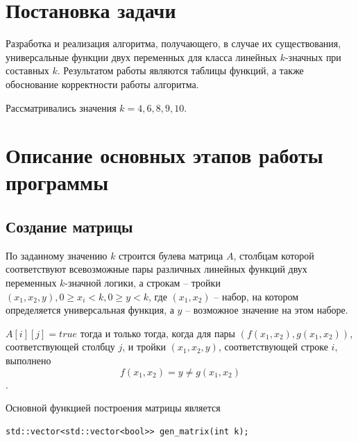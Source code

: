 \documentclass[oneside,final,14pt]{extreport}
\begin{document}



  \chapter*{Постановка задачи}
  
Разработка и реализация алгоритма, получающего, в случае их существования, универсальные функции 
двух переменных для класса линейных \(k\)-значных при составных \(k\). Результатом работы являются таблицы 
функций, а также обоснование корректности работы алгоритма.
  
Рассматривались значения \(k = 4, 6, 8, 9, 10\).

\chapter*{Описание основных этапов работы программы}

\section*{Создание матрицы}

По заданному значению \(k\) строится булева матрица \(A\), столбцам которой соответствуют всевозможные пары различных линейных 
функций двух переменных \(k\)-значной логики, а строкам -- тройки \((x_1, x_2, y), 0 \geq x_i < k, 0 \geq y < k\), 
где \((x_1, x_2)\) -- набор, на котором определяется универсальная функция, а \(y\) -- возможное значение на этом наборе.

\(A[i][j] = true\) тогда и только тогда, когда для пары \((f(x_1, x_2), g(x_1, x_2))\), соответствующей столбцу \(j\), и тройки 
\((x_1, x_2, y)\), соответствующей строке \(i\), выполнено \[f(x_1, x_2) = y \neq g(x_1, x_2)\].

Основной функцией построения матрицы является

\begin{lstlisting}
std::vector<std::vector<bool>> gen_matrix(int k);
\end{lstlisting}
\end{document}
